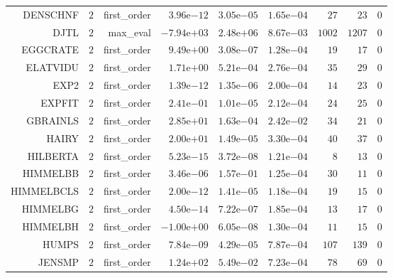 \begin{longtable}{rrrrrrrrr}
DENSCHNF & \(     2\) & first\_order & \( 3.96\)e\(-12\) & \( 3.05\)e\(-05\) & \( 1.65\)e\(-04\) & \(    27\) & \(    23\) & \(     0\) \\
DJTL & \(     2\) & max\_eval & \(-7.94\)e\(+03\) & \( 2.48\)e\(+06\) & \( 8.67\)e\(-03\) & \(  1002\) & \(  1207\) & \(     0\) \\
EGGCRATE & \(     2\) & first\_order & \( 9.49\)e\(+00\) & \( 3.08\)e\(-07\) & \( 1.28\)e\(-04\) & \(    19\) & \(    17\) & \(     0\) \\
ELATVIDU & \(     2\) & first\_order & \( 1.71\)e\(+00\) & \( 5.21\)e\(-04\) & \( 2.76\)e\(-04\) & \(    35\) & \(    29\) & \(     0\) \\
EXP2 & \(     2\) & first\_order & \( 1.39\)e\(-12\) & \( 1.35\)e\(-06\) & \( 2.00\)e\(-04\) & \(    14\) & \(    23\) & \(     0\) \\
EXPFIT & \(     2\) & first\_order & \( 2.41\)e\(-01\) & \( 1.01\)e\(-05\) & \( 2.12\)e\(-04\) & \(    24\) & \(    25\) & \(     0\) \\
GBRAINLS & \(     2\) & first\_order & \( 2.85\)e\(+01\) & \( 1.63\)e\(-04\) & \( 2.42\)e\(-02\) & \(    34\) & \(    21\) & \(     0\) \\
HAIRY & \(     2\) & first\_order & \( 2.00\)e\(+01\) & \( 1.49\)e\(-05\) & \( 3.30\)e\(-04\) & \(    40\) & \(    37\) & \(     0\) \\
HILBERTA & \(     2\) & first\_order & \( 5.23\)e\(-15\) & \( 3.72\)e\(-08\) & \( 1.21\)e\(-04\) & \(     8\) & \(    13\) & \(     0\) \\
HIMMELBB & \(     2\) & first\_order & \( 3.46\)e\(-06\) & \( 1.57\)e\(-01\) & \( 1.25\)e\(-04\) & \(    30\) & \(    11\) & \(     0\) \\
HIMMELBCLS & \(     2\) & first\_order & \( 2.00\)e\(-12\) & \( 1.41\)e\(-05\) & \( 1.18\)e\(-04\) & \(    19\) & \(    15\) & \(     0\) \\
HIMMELBG & \(     2\) & first\_order & \( 4.50\)e\(-14\) & \( 7.22\)e\(-07\) & \( 1.85\)e\(-04\) & \(    13\) & \(    17\) & \(     0\) \\
HIMMELBH & \(     2\) & first\_order & \(-1.00\)e\(+00\) & \( 6.05\)e\(-08\) & \( 1.30\)e\(-04\) & \(    11\) & \(    15\) & \(     0\) \\
HUMPS & \(     2\) & first\_order & \( 7.84\)e\(-09\) & \( 4.29\)e\(-05\) & \( 7.87\)e\(-04\) & \(   107\) & \(   139\) & \(     0\) \\
JENSMP & \(     2\) & first\_order & \( 1.24\)e\(+02\) & \( 5.49\)e\(-02\) & \( 7.23\)e\(-04\) & \(    78\) & \(    69\) & \(     0\) \\

\end{longtable}
